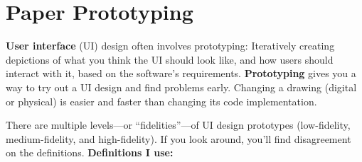 \yesmargins

\chapter{Paper Prototyping}


\marginpar{\userInterfaceDef}

\textbf{User interface} (UI) design often involves prototyping: Iteratively creating depictions of what you think the UI should look like, and how users should interact with it, based on the software's requirements. \textbf{Prototyping} gives you a way to try out a UI design and find problems early. Changing a drawing (digital or physical) is easier and faster than changing its code implementation.

There are multiple levels---or ``fidelities''---of UI design prototypes (low-fidelity, medium-fidelity, and high-fidelity). If you look around, you'll find disagreement on the definitions. 
\textbf{Definitions I use:}

